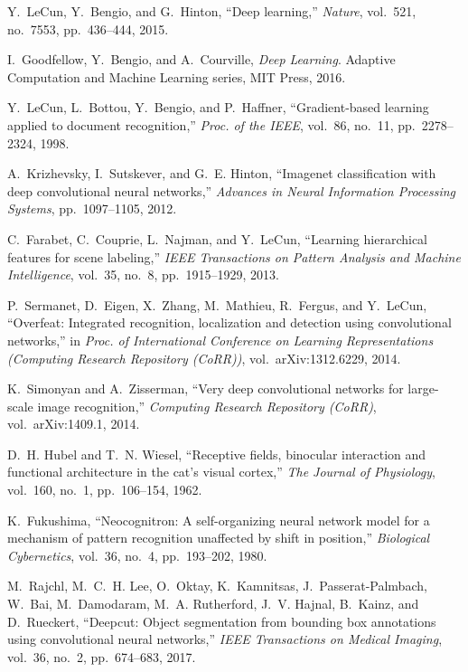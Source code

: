 \documentclass[journal,twocolumn]{IEEEtran}
\begin{document}
\begin{thebibliography}{10}
Y.~LeCun, Y.~Bengio, and G.~Hinton, ``{Deep learning},'' {\em Nature},
  vol.~521, no.~7553, pp.~436--444, 2015.

I.~Goodfellow, Y.~Bengio, and A.~Courville, {\em {Deep Learning}}.
\newblock Adaptive Computation and Machine Learning series, MIT Press, 2016.

Y.~LeCun, L.~Bottou, Y.~Bengio, and P.~Haffner, ``{Gradient-based learning
  applied to document recognition},'' {\em Proc. of the IEEE}, vol.~86, no.~11,
  pp.~2278--2324, 1998.

A.~Krizhevsky, I.~Sutskever, and G.~E. Hinton, ``{Imagenet classification with
  deep convolutional neural networks},'' {\em Advances in Neural Information
  Processing Systems}, pp.~1097--1105, 2012.

C.~Farabet, C.~Couprie, L.~Najman, and Y.~LeCun, ``{Learning hierarchical
  features for scene labeling},'' {\em IEEE Transactions on Pattern Analysis
  and Machine Intelligence}, vol.~35, no.~8, pp.~1915--1929, 2013.

P.~Sermanet, D.~Eigen, X.~Zhang, M.~Mathieu, R.~Fergus, and Y.~LeCun,
  ``{Overfeat: Integrated recognition, localization and detection using
  convolutional networks},'' in {\em Proc. of International Conference on
  Learning Representations (Computing Research Repository {(CoRR)})},
  vol.~arXiv:1312.6229, 2014.

K.~Simonyan and A.~Zisserman, ``Very deep convolutional networks for
  large-scale image recognition,'' {\em Computing Research Repository
  {(CoRR)}}, vol.~arXiv:1409.1, 2014.

D.~H. Hubel and T.~N. Wiesel, ``{Receptive fields, binocular interaction and
  functional architecture in the cat's visual cortex},'' {\em The Journal of
  Physiology}, vol.~160, no.~1, pp.~106--154, 1962.

K.~Fukushima, ``{Neocognitron: A self-organizing neural network model for a
  mechanism of pattern recognition unaffected by shift in position},'' {\em
  Biological Cybernetics}, vol.~36, no.~4, pp.~193--202, 1980.

M.~Rajchl, M.~C.~H. Lee, O.~Oktay, K.~Kamnitsas, J.~Passerat-Palmbach, W.~Bai,
  M.~Damodaram, M.~A. Rutherford, J.~V. Hajnal, B.~Kainz, and D.~Rueckert,
  ``Deepcut: Object segmentation from bounding box annotations using
  convolutional neural networks,'' {\em IEEE Transactions on Medical Imaging},
  vol.~36, no.~2, pp.~674--683, 2017.


\end{thebibliography}
\end{document}
